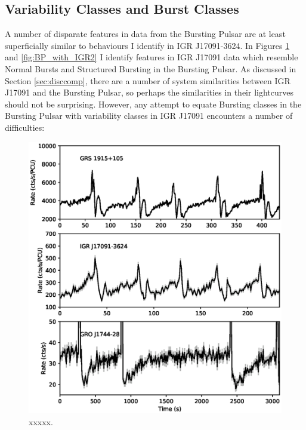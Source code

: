 \subsection{Variability Classes and Burst Classes}

\par A number of disparate features in data from the Bursting Pulsar are at least superficially similar to behaviours I identify in IGR J17091-3624.  In Figures \ref{fig:BP_with_IGR1} and \ref{fig:BP_with_IGR2} I identify features in IGR J17091 data which resemble Normal Bursts and Structured Bursting in the Bursting Pulsar.  As discussed in Section \ref{sec:disccomp}, there are a number of system similarities between IGR J17091 and the Bursting Pulsar, so perhaps the similarities in their lightcurves should not be surprising.  However, any attempt to equate Bursting classes in the Bursting Pulsar with variability classes in IGR J17091 encounters a number of difficulties:

\begin{figure}
  \centering
  \includegraphics[width=.9\linewidth, trim= 0mm 0mm 0mm 0mm,clip]{images/BPco1.eps}
  \caption[Lightcurves from GRS 1915, IGR J17091 and the Bursting Pulsar, showing lightcurves with Normal Burst-like behaviour for each.]{xxxxx.}
  \label{fig:BP_with_IGR1}
\end{figure}

